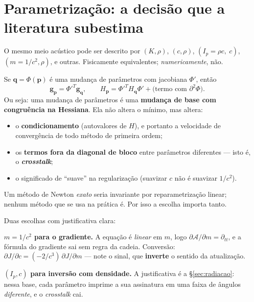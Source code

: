 \documentclass[11pt,a4paper,oneside]{report}
\begin{document}
\section{Parametriza\c{c}\~ao: a decis\~ao que a literatura subestima}
\label{sec:param}

O mesmo meio ac\'ustico pode ser descrito por $(K,\rho)$, $(c,\rho)$,
$(I_p = \rho c,\;c)$, $(m = 1/c^{2},\rho)$, e outras. Fisicamente equivalentes;
\emph{numericamente}, n\~ao.

\begin{teoria}
Se $\mathbf{q} = \Phi(\mathbf{p})$ \'e uma mudan\c{c}a de par\^ametros com
jacobiana $\Phi'$, ent\~ao
\[
\mathbf{g}_{\mathbf{p}} = \Phi'^{T}\mathbf{g}_{\mathbf{q}},
\qquad
H_{\mathbf{p}} = \Phi'^{T}H_{\mathbf{q}}\Phi'
 + \text{(termo com $\partial^{2}\Phi$)} .
\]
Ou seja: uma mudan\c{c}a de par\^ametros \'e uma \textbf{mudan\c{c}a de base
com congru\^encia na Hessiana}. Ela n\~ao altera o m\'inimo, mas altera:
\begin{itemize}[leftmargin=*, itemsep=1pt]
\item o \textbf{condicionamento} (autovalores de $H$), e portanto a velocidade
de converg\^encia de todo m\'etodo de primeira ordem;
\item os \textbf{termos fora da diagonal de bloco} entre par\^ametros
diferentes --- isto \'e, o \textbf{\emph{crosstalk}};
\item o significado de ``suave'' na regulariza\c{c}\~ao (suavizar $c$ n\~ao
\'e suavizar $1/c^{2}$).
\end{itemize}

Um m\'etodo de Newton \emph{exato} seria invariante por reparametriza\c{c}\~ao
linear; nenhum m\'etodo que se usa na pr\'atica \'e. Por isso a escolha
importa tanto.
\end{teoria}

Duas escolhas com justificativa clara:

\textbf{$m = 1/c^{2}$ para o gradiente.} A equa\c{c}\~ao \'e \emph{linear} em
$m$, logo $\partial\mathcal{A}/\partial m = \partial_{tt}$, e a f\'ormula do
gradiente sai sem regra da cadeia. Convers\~ao:
$\partial J/\partial c = (-2/c^{3})\,\partial J/\partial m$ --- note o sinal,
que \textbf{inverte} o sentido da atualiza\c{c}\~ao.

\textbf{$(I_p, c)$ para invers\~ao com densidade.} A justificativa \'e a
§\ref{sec:radiacao}: nessa base, cada par\^ametro imprime a sua assinatura em
uma faixa de \^angulos \emph{diferente}, e o \emph{crosstalk} cai.
\end{document}
